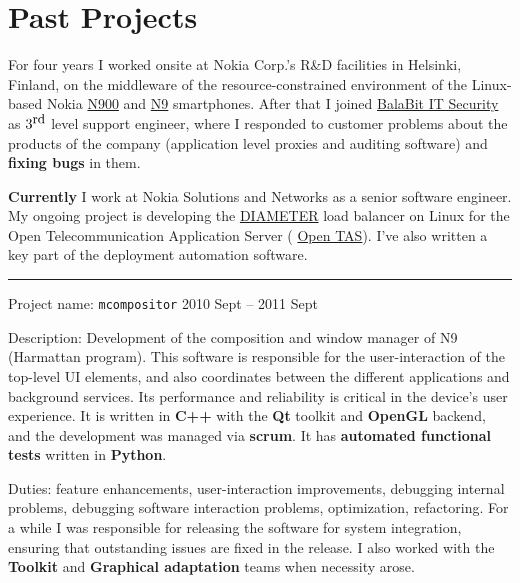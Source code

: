 \documentclass[a4paper,12pt]{article}
\newcommand\Yell{\textbf}
\newcommand\Label{\textsf}
\newcommand{\midline}{\rule[0.5ex]{\linewidth-\parindent}{.5pt}}
\begin{document}
\section{Past Projects}

For four years I worked onsite at Nokia Corp.'s R\&D facilities in Helsinki,
Finland, on the middleware of the resource-constrained environment of the
Linux-based Nokia \href{http://maemo.org/intro/maemo_history/}{N900} and
\href{http://www.nokia.com/global/products/phone/n9}{N9} smartphones.
After that I joined \href{http://balabit.com}{BalaBit IT Security} as
$3^{\textrm{\small rd}}$ level support engineer, where I responded to
customer problems about the products of the company (application level
proxies and auditing software) and \Yell{fixing bugs} in them.

\medskip
\Yell{Currently} I work at Nokia Solutions and Networks as a senior
software engineer.  My ongoing project is developing the
\href{http://tools.ietf.org/html/rfc6733}{DIAMETER} load balancer
on Linux for the Open Telecommunication Application Server (%
\href{http://nsn.com/portfolio/products/ip-multimedia-subsystem-ims-core/open-tas}%
{Open TAS}).  I've also written a key part of the deployment automation
software.

\midline\par
\Label{Project name}: \texttt{mcompositor}\hfill
\Label{2010 Sept -- 2011 Sept}\par
\Label{Description}: Development of the composition and window manager of N9
(Harmattan program).  This software is responsible for the user-interaction
of the top-level UI elements, and also coordinates between the different
applications and background services.  Its performance and reliability is
critical in the device's user experience.  It is written in \Yell{C++} with
the \Yell{Qt} toolkit and \Yell{OpenGL} backend, and the development was
managed via \Yell{scrum}.  It has \Yell{automated functional tests} written in
\Yell{Python}.\par
\Label{Duties}: feature enhancements, user-interaction improvements,
debugging internal problems, debugging software interaction problems,
optimization, refactoring.  For a while I was responsible for releasing
the software for system integration, ensuring that outstanding issues
are fixed in the release.  I also worked with the \Yell{Toolkit} and
\Yell{Graphical adaptation} teams when necessity arose.
\end{document}
